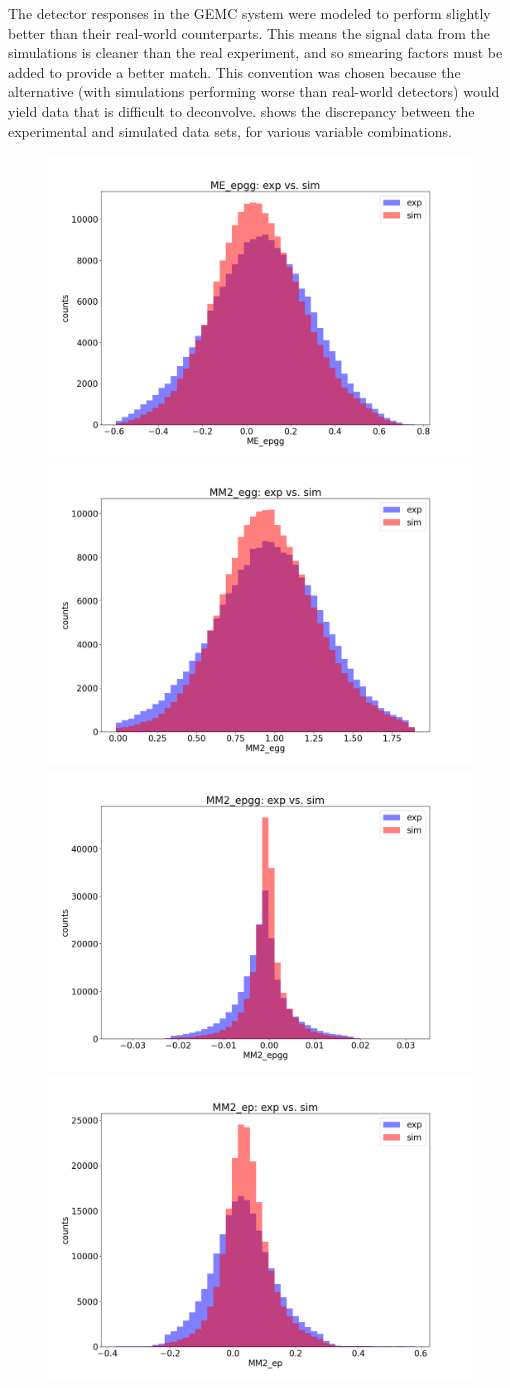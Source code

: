 
The detector responses in the GEMC system were modeled to perform slightly better than their real-world counterparts. This means the signal data from the simulations is cleaner than the real experiment, and so smearing factors must be added to provide a better match. This convention was chosen because the alternative (with simulations performing worse than real-world detectors) would yield data that is difficult to deconvolve.  shows the discrepancy between the experimental and simulated data sets, for various variable combinations. 

\begin{figure}[hbt]
	\centering
	\includegraphics[page=125,width=0.3\linewidth]{Chapters/Ch4-BaseAnalysis/0_preprocessing/0_B_simulation_data_preprocessing/pics/nosmear/outbending_rad_All_All_All_no_smearingME_epgg_exp_vs_sim.png}
	\includegraphics[page=123,width=0.3\linewidth]{Chapters/Ch4-BaseAnalysis/0_preprocessing/0_B_simulation_data_preprocessing/pics/nosmear/outbending_rad_All_All_All_no_smearingMM2_egg_exp_vs_sim.png}
	\includegraphics[page=128,width=0.3\linewidth]{Chapters/Ch4-BaseAnalysis/0_preprocessing/0_B_simulation_data_preprocessing/pics/nosmear/outbending_rad_All_All_All_no_smearingMM2_epgg_exp_vs_sim.png}
	\includegraphics[page=130,width=0.3\linewidth]{Chapters/Ch4-BaseAnalysis/0_preprocessing/0_B_simulation_data_preprocessing/pics/nosmear/outbending_rad_All_All_All_no_smearingMM2_ep_exp_vs_sim.png}

\end{figure}

